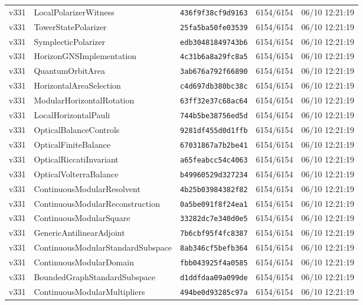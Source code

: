 \documentclass[11pt]{article}
\theoremstyle{definition}\newtheorem{deriv}{Derivation}
\begin{document}
{\begin{longtable}{@{}lllll@{}}
v331 & LocalPolarizerWitness & \texttt{436f9f38cf9d9163} & 6154/6154 & 06/10 12:21:19 \\
v331 & TowerStatePolarizer & \texttt{25fa5ba50fe03539} & 6154/6154 & 06/10 12:21:19 \\
v331 & SymplecticPolarizer & \texttt{edb30481849743b6} & 6154/6154 & 06/10 12:21:19 \\
v331 & HorizonGNSImplementation & \texttt{4c31b6a8a29fc8a5} & 6154/6154 & 06/10 12:21:19 \\
v331 & QuantumOrbitArea & \texttt{3ab676a792f66890} & 6154/6154 & 06/10 12:21:19 \\
v331 & HorizontalAreaSelection & \texttt{c4d697db380bc38c} & 6154/6154 & 06/10 12:21:19 \\
v331 & ModularHorizontalRotation & \texttt{63ff32e37c68ac64} & 6154/6154 & 06/10 12:21:19 \\
v331 & LocalHorizontalPauli & \texttt{744b5be38756ed5d} & 6154/6154 & 06/10 12:21:19 \\
v331 & OpticalBalanceControls & \texttt{9281df455d0d1ffb} & 6154/6154 & 06/10 12:21:19 \\
v331 & OpticalFiniteBalance & \texttt{67031867a7b2be41} & 6154/6154 & 06/10 12:21:19 \\
v331 & OpticalRiccatiInvariant & \texttt{a65feabcc54c4063} & 6154/6154 & 06/10 12:21:19 \\
v331 & OpticalVolterraBalance & \texttt{b49960529d327234} & 6154/6154 & 06/10 12:21:19 \\
v331 & ContinuousModularResolvent & \texttt{4b25b03984382f82} & 6154/6154 & 06/10 12:21:19 \\
v331 & ContinuousModularReconstruction & \texttt{0a5be091f8f24ea1} & 6154/6154 & 06/10 12:21:19 \\
v331 & ContinuousModularSquare & \texttt{33282dc7e340d0e5} & 6154/6154 & 06/10 12:21:19 \\
v331 & GenericAntilinearAdjoint & \texttt{7b6cbf95f4fc8387} & 6154/6154 & 06/10 12:21:19 \\
v331 & ContinuousModularStandardSubspace & \texttt{8ab346cf5befb364} & 6154/6154 & 06/10 12:21:19 \\
v331 & ContinuousModularDomain & \texttt{fbb043925f4a0585} & 6154/6154 & 06/10 12:21:19 \\
v331 & BoundedGraphStandardSubspace & \texttt{d1ddfdaa09a099de} & 6154/6154 & 06/10 12:21:19 \\
v331 & ContinuousModularMultipliers & \texttt{494be0d93285c97a} & 6154/6154 & 06/10 12:21:19 \\

\end{longtable}}
\end{document}
